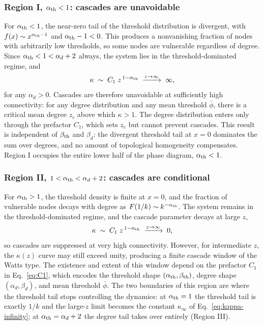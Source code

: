 \documentclass[]{revtex4-2}
\begin{document}
\subsubsection*{Region I, $\alpha_{\rm th}<1$: cascades are unavoidable}

For $\alpha_{\rm th}<1$, the near-zero tail of the threshold distribution is divergent, with $f(x)\sim x^{\alpha_{\rm th}-1}$ and $\alpha_{\rm th}-1<0$. This produces a nonvanishing fraction of nodes with arbitrarily low thresholds, so some nodes are vulnerable regardless of degree. Since $\alpha_{\rm th}<1<\alpha_d+2$ always, the system lies in the threshold-dominated regime, and
\begin{equation}
    \kappa \;\sim\; C_1\;z^{\,1-\alpha_{\rm th}} \;\xrightarrow{z\to\infty}\; \infty ,
\end{equation}
for any $\alpha_d>0$. Cascades are therefore unavoidable at sufficiently high connectivity: for any degree distribution and any mean threshold $\bar\phi$, there is a critical mean degree $z_c$ above which $\kappa>1$. The degree distribution enters only through the prefactor $C_1$, which sets $z_c$ but cannot prevent cascades. This result is independent of $\beta_{\rm th}$ and $\beta_d$: the divergent threshold tail at $x=0$ dominates the sum over degrees, and no amount of topological homogeneity compensates. Region I occupies the entire lower half of the phase diagram, $\alpha_{\rm th}<1$.

\subsubsection*{Region II, $1<\alpha_{\rm th}<\alpha_d+2$: cascades are conditional}

For $\alpha_{\rm th}>1$, the threshold density is finite at $x=0$, and the fraction of vulnerable nodes decays with degree as $F(1/k)\sim k^{-\alpha_{\rm th}}$. The system remains in the threshold-dominated regime, and the cascade parameter decays at large $z$,
\begin{equation}
    \kappa \;\sim\; C_1\;z^{\,1-\alpha_{\rm th}} \;\xrightarrow{z\to\infty}\; 0 ,
\end{equation}
so cascades are suppressed at very high connectivity. However, for intermediate $z$, the $\kappa(z)$ curve may still exceed unity, producing a finite cascade window of the Watts type. The existence and extent of this window depend on the prefactor $C_1$ in Eq.~\eqref{eq:C1}, which encodes the threshold shape $(\alpha_{\rm th},\beta_{\rm th})$, degree shape $(\alpha_d,\beta_d)$, and mean threshold $\bar\phi$. The two boundaries of this region are where the threshold tail stops controlling the dynamics: at $\alpha_{\rm th}=1$ the threshold tail is exactly $1/k$ and the large-$z$ limit becomes the constant $\kappa_\infty$ of Eq.~\eqref{eq:kappa-infinity}; at $\alpha_{\rm th}=\alpha_d+2$ the degree tail takes over entirely (Region III).
\end{document}
